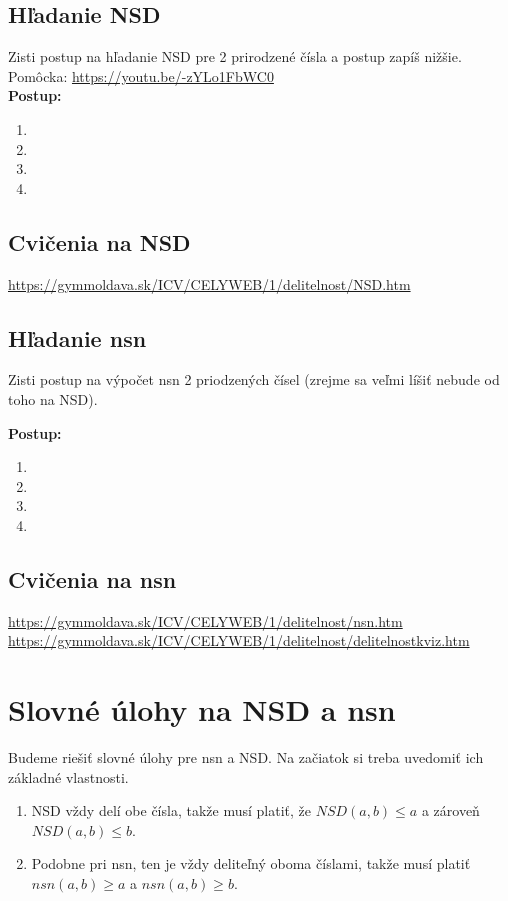 \documentclass[12pt]{article}
\begin{document}
	\subsection{Hľadanie NSD}
	Zisti postup na hľadanie NSD pre 2 prirodzené čísla a postup zapíš nižšie.\\
	Pomôcka: \url{https://youtu.be/-zYLo1FbWC0}\\
	
	\textbf{Postup:}
	\begin{enumerate}
		\item 
		\item
		\item
		\item
	\end{enumerate}
	
	\subsection{Cvičenia na NSD}
	\url{https://gymmoldava.sk/ICV/CELYWEB/1/delitelnost/NSD.htm}
	
	\subsection{Hľadanie nsn}
	Zisti postup na výpočet nsn 2 priodzených čísel (zrejme sa veľmi líšiť nebude od toho na NSD).
	
	\textbf{Postup:}
	\begin{enumerate}
		\item 
		\item
		\item
		\item
	\end{enumerate}
	
	\subsection{Cvičenia na nsn}
	\url{https://gymmoldava.sk/ICV/CELYWEB/1/delitelnost/nsn.htm}\\
	\url{https://gymmoldava.sk/ICV/CELYWEB/1/delitelnost/delitelnostkviz.htm}
	
	\newpage
	\section{Slovné úlohy na NSD a nsn}
	\qquad Budeme riešiť slovné úlohy pre nsn a NSD. Na začiatok si treba uvedomiť ich základné vlastnosti.
	\begin{enumerate}
		\item NSD vždy delí obe čísla, takže musí platiť, že $NSD(a, b) \leq a$ a zároveň $NSD(a, b) \leq b$.
		\item Podobne pri nsn, ten je vždy deliteľný oboma číslami, takže musí platiť $nsn(a,b) \geq a$ a $nsn(a,b) \geq b$.
		
	\end{enumerate}
	
\end{document}
